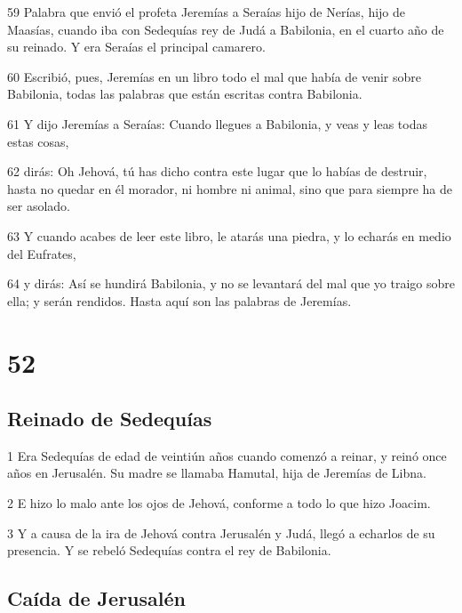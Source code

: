 \par 59 Palabra que envió el profeta Jeremías a Seraías hijo de Nerías, hijo de Maasías, cuando iba con Sedequías rey de Judá a Babilonia, en el cuarto año de su reinado. Y era Seraías el principal camarero.
\par 60 Escribió, pues, Jeremías en un libro todo el mal que había de venir sobre Babilonia, todas las palabras que están escritas contra Babilonia.
\par 61 Y dijo Jeremías a Seraías: Cuando llegues a Babilonia, y veas y leas todas estas cosas,
\par 62 dirás: Oh Jehová, tú has dicho contra este lugar que lo habías de destruir, hasta no quedar en él morador, ni hombre ni animal, sino que para siempre ha de ser asolado.
\par 63 Y cuando acabes de leer este libro, le atarás una piedra, y lo echarás en medio del Eufrates,
\par 64 y dirás: Así se hundirá Babilonia, y no se levantará del mal que yo traigo sobre ella; y serán rendidos. Hasta aquí son las palabras de Jeremías. 

\chapter{52}

\section*{Reinado de Sedequías }

\par 1 Era Sedequías de edad de veintiún años cuando comenzó a reinar, y reinó once años en Jerusalén. Su madre se llamaba Hamutal, hija de Jeremías de Libna.
\par 2 E hizo lo malo ante los ojos de Jehová, conforme a todo lo que hizo Joacim.
\par 3 Y a causa de la ira de Jehová contra Jerusalén y Judá, llegó a echarlos de su presencia. Y se rebeló Sedequías contra el rey de Babilonia.

\section*{Caída de Jerusalén}

